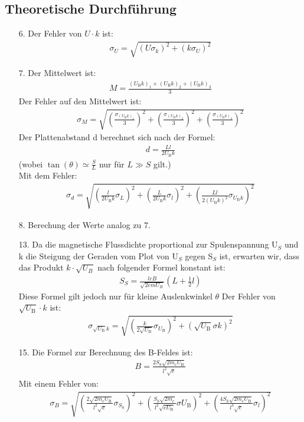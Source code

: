 \documentclass[12pt]{scrartcl}
\begin{document}
\subsection{Theoretische Durchführung}
\begin{itemize}
\item[6.]
Der Fehler von $U \cdot k$ ist:
\begin{align}
\sigma_U = \sqrt{\left(U \sigma_k \right)^2+\left(k \sigma_U\right)^2}
\end{align}
\item[7.]
Der Mittelwert ist:
\begin{align}
M = \frac{(U_{\text{B}}k)_1+
(U_{\text{B}}k)_2+
(U_{\text{B}}k)_3}{3}
\end{align}
Der Fehler auf den Mittelwert ist:
\begin{align}
\sigma_M =\sqrt{
\left(\frac{\sigma_{(U_{\text{B}}k)_1}}{3}\right)^2+ \left(\frac{\sigma_{(U_{\text{B}}k)_2}}{3}\right)^2+
\left(\frac{\sigma_{(U_{\text{B}}k)_3}}{3}\right)^2}
\end{align}
Der Plattenabstand d berechnet sich nach der Formel:
\begin{align}
d= \frac{L l}{2 U_\text{B} k}
\end{align}
(wobei $\tan(\theta) \simeq \frac{S}{L}$ nur für $L \gg S$ gilt.)\\
Mit dem Fehler:
\begin{align}
\sigma_d = \sqrt{
\left(\frac{l}{2 U_\text{B} k}\sigma_{L}\right)^2+
\left(\frac{L}{2 U_\text{B} k}\sigma_l\right)^2+
\left(\frac{L l}{2 (U_\text{B} k)^2}\sigma_{U_\text{B} k}\right)^2}
\end{align}
\item[8.]
Berechung der Werte analog zu 7.
\item[13.]
Da die magnetische Flussdichte proportional zur Spulenspannung U$_S$ und k die Steigung der Geraden vom Plot von U$_S$ gegen S$_S$ ist, erwarten wir, dass das Produkt $k\cdot\sqrt{U_B}$ nach folgender Formel konstant ist:
\begin{align}
S_S = \frac{leB}{\sqrt{2em U_B}}(L+\frac{1}{2}l)
\end{align}
Diese Formel gilt jedoch nur für kleine Auslenkwinkel $\theta$
Der Fehler von $\sqrt{U_\text{B}} \cdot k$ ist:
\begin{align}
\sigma_{\sqrt{U_\text{B}}k} = \sqrt{
\left(\frac{k}{2\sqrt{U_\text{B}}}\sigma_{U_\text{B}}\right)^2+
\left(\sqrt{U_\text{B}}\sigma{k}\right)^2}
\end{align}
\item[15.]
Die Formel zur Berechnung des B-Feldes ist:
\begin{align}
B = \frac{2 S_\text{S}\sqrt{2 m_e U_\text{B}}}{l^2 \sqrt{e}}
\end{align}
Mit einem Fehler von:
\begin{align}
\sigma_B = \sqrt{
\left(\frac{2 \sqrt{2 m_e U_\text{B}}}{l^2 \sqrt{e}}\sigma_{S_\text{S}}\right)^2+
\left(\frac{S_\text{S}\sqrt{2 m_e}}{l^2 \sqrt{e U_\text{B}}}\sigma{U_\text{B}}\right)^2+
\left(\frac{4 S_\text{S}\sqrt{2 m_e U_\text{B}}}{l^3 \sqrt{e}}\sigma_l\right)^2
}
\end{align}
\end{itemize}
\end{document}
